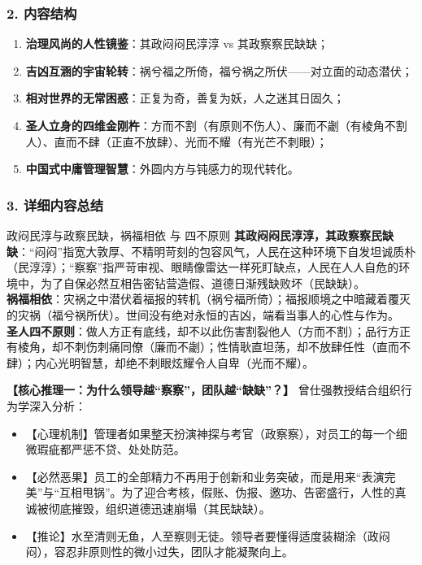 \subsubsection{2. 内容结构}
\begin{enumerate}
    \item \textbf{治理风尚的人性镜鉴}：其政闷闷民淳淳 vs 其政察察民缺缺；
    \item \textbf{吉凶互涵的宇宙轮转}：祸兮福之所倚，福兮祸之所伏——对立面的动态潜伏；
    \item \textbf{相对世界的无常困惑}：正复为奇，善复为妖，人之迷其日固久；
    \item \textbf{圣人立身的四维金刚杵}：方而不割（有原则不伤人）、廉而不劌（有棱角不割人）、直而不肆（正直不放肆）、光而不耀（有光芒不刺眼）；
    \item \textbf{中国式中庸管理智慧}：外圆内方与钝感力的现代转化。
\end{enumerate}

\subsubsection{3. 详细内容总结}

\begin{ConceptBox}{政闷民淳与政察民缺，祸福相依 与 四不原则}
\textbf{其政闷闷民淳淳，其政察察民缺缺}：“闷闷”指宽大敦厚、不精明苛刻的包容风气，人民在这种环境下自发坦诚质朴（民淳淳）；“察察”指严苛审视、眼睛像雷达一样死盯缺点，人民在人人自危的环境中，为了自保必然互相告密钻营造假、道德日渐残缺败坏（民缺缺）。\\
\textbf{祸福相依}：灾祸之中潜伏着福报的转机（祸兮福所倚）；福报顺境之中暗藏着覆灭的灾祸（福兮祸所伏）。世间没有绝对永恒的吉凶，端看当事人的心性与作为。\\
\textbf{圣人四不原则}：做人方正有底线，却不以此伤害割裂他人（方而不割）；品行方正有棱角，却不刺伤刺痛同僚（廉而不劌）；性情耿直坦荡，却不放肆任性（直而不肆）；内心光明智慧，却绝不刺眼炫耀令人自卑（光而不耀）。
\end{ConceptBox}

\noindent\textbf{【核心推理一：为什么领导越“察察”，团队越“缺缺”？】}
曾仕强教授结合组织行为学深入分析：
\begin{itemize}
    \item 【心理机制】管理者如果整天扮演神探与考官（政察察），对员工的每一个细微瑕疵都严惩不贷、处处防范。
    \item 【必然恶果】员工的全部精力不再用于创新和业务突破，而是用来“表演完美”与“互相甩锅”。为了迎合考核，假账、伪报、邀功、告密盛行，人性的真诚被彻底摧毁，组织道德迅速崩塌（其民缺缺）。
    \item 【推论】水至清则无鱼，人至察则无徒。领导者要懂得适度装糊涂（政闷闷），容忍非原则性的微小过失，团队才能凝聚向上。
\end{itemize}


